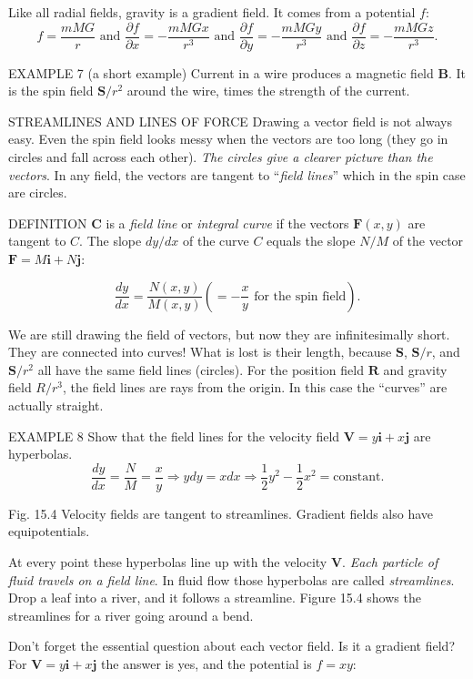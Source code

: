 Like all radial fields, gravity is a gradient field. It comes from a potential $f$:
$$f=\dfrac{mMG}{r} \text{ and }\dfrac{\partial f}{\partial x}=-\dfrac{mMGx}{r^3} \text{ and }\dfrac{\partial f}{\partial y}=-\dfrac{mMGy}{r^3} \text{ and }\dfrac{\partial f}{\partial z}=-\dfrac{mMGz}{r^3}.$$ 

EXAMPLE 7 (a short example) Current in a wire produces a magnetic field $\mathbf{B}$. It is
the spin field $\mathbf{S}/r^2$ around the wire, times the strength of the current.

STREAMLINES AND LINES OF FORCE
Drawing a vector field is not always easy. Even the spin field looks messy when the
vectors are too long (they go in circles and fall across each other). \emph{The circles give a
clearer picture than the vectors}. In any field, the vectors are tangent to ``\emph{field lines}'' which
in the spin case are circles.

DEFINITION $\mathbf{C}$ is a \emph{field line} or \emph{integral curve} if the vectors $\mathbf{F}(x, y)$ are tangent to $C$.
The slope $dy/dx$ of the curve $C$ equals the slope $N/M$ of the vector $\mathbf{F} =M\mathbf{i} + N\mathbf{j}$:

$$\dfrac{dy}{dx}=\dfrac{N(x,y)}{M(x,y)} \left(=-\dfrac{x}{y} \text{ for the spin field}\right).$$

We are still drawing the field of vectors, but now they are infinitesimally short.
They are connected into curves! What is lost is their length, because $\mathbf{S}$, $\mathbf{S}/r$, and
$\mathbf{S}/r^2$ all have the same field lines (circles). For the position field $\mathbf{R}$ and gravity field
$R/r^3$, the field lines are rays from the origin. In this case the ``curves'' are actually
straight.

EXAMPLE 8 Show that the field lines for the velocity field $\mathbf{V} =y\mathbf{i} +x\mathbf{j}$ are hyperbolas.
$$\dfrac{dy}{dx}=\dfrac{N}{M}=\dfrac{x}{y} \Rightarrow ydy=xdx \Rightarrow \frac{1}{2}y^2-\frac{1}{2}x^2=\text{constant}.$$

Fig. 15.4 Velocity fields are tangent to streamlines. Gradient fields also have equipotentials.


At every point these hyperbolas line up with the velocity $\mathbf{V}$. \emph{Each particle of fluid
travels on a field line}. In fluid flow those hyperbolas are called \emph{streamlines}. Drop a
leaf into a river, and it follows a streamline. Figure 15.4 shows the streamlines for a
river going around a bend.


Don't forget the essential question about each vector field. Is it a gradient field?
For $\mathbf{V} = y\mathbf{i} + x\mathbf{j}$ the answer is yes, and the potential is $f = xy$:

